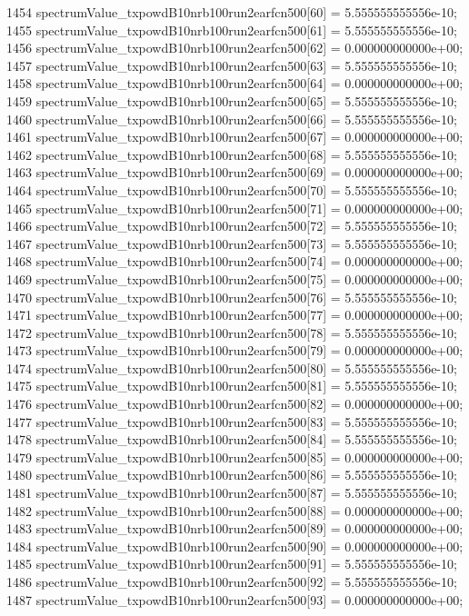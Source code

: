 \begin{DoxyCode}
1454   spectrumValue\_txpowdB10nrb100run2earfcn500[60] = 5.555555555556e-10;
1455   spectrumValue\_txpowdB10nrb100run2earfcn500[61] = 5.555555555556e-10;
1456   spectrumValue\_txpowdB10nrb100run2earfcn500[62] = 0.000000000000e+00;
1457   spectrumValue\_txpowdB10nrb100run2earfcn500[63] = 5.555555555556e-10;
1458   spectrumValue\_txpowdB10nrb100run2earfcn500[64] = 0.000000000000e+00;
1459   spectrumValue\_txpowdB10nrb100run2earfcn500[65] = 5.555555555556e-10;
1460   spectrumValue\_txpowdB10nrb100run2earfcn500[66] = 5.555555555556e-10;
1461   spectrumValue\_txpowdB10nrb100run2earfcn500[67] = 0.000000000000e+00;
1462   spectrumValue\_txpowdB10nrb100run2earfcn500[68] = 5.555555555556e-10;
1463   spectrumValue\_txpowdB10nrb100run2earfcn500[69] = 0.000000000000e+00;
1464   spectrumValue\_txpowdB10nrb100run2earfcn500[70] = 5.555555555556e-10;
1465   spectrumValue\_txpowdB10nrb100run2earfcn500[71] = 0.000000000000e+00;
1466   spectrumValue\_txpowdB10nrb100run2earfcn500[72] = 5.555555555556e-10;
1467   spectrumValue\_txpowdB10nrb100run2earfcn500[73] = 5.555555555556e-10;
1468   spectrumValue\_txpowdB10nrb100run2earfcn500[74] = 0.000000000000e+00;
1469   spectrumValue\_txpowdB10nrb100run2earfcn500[75] = 0.000000000000e+00;
1470   spectrumValue\_txpowdB10nrb100run2earfcn500[76] = 5.555555555556e-10;
1471   spectrumValue\_txpowdB10nrb100run2earfcn500[77] = 0.000000000000e+00;
1472   spectrumValue\_txpowdB10nrb100run2earfcn500[78] = 5.555555555556e-10;
1473   spectrumValue\_txpowdB10nrb100run2earfcn500[79] = 0.000000000000e+00;
1474   spectrumValue\_txpowdB10nrb100run2earfcn500[80] = 5.555555555556e-10;
1475   spectrumValue\_txpowdB10nrb100run2earfcn500[81] = 5.555555555556e-10;
1476   spectrumValue\_txpowdB10nrb100run2earfcn500[82] = 0.000000000000e+00;
1477   spectrumValue\_txpowdB10nrb100run2earfcn500[83] = 5.555555555556e-10;
1478   spectrumValue\_txpowdB10nrb100run2earfcn500[84] = 5.555555555556e-10;
1479   spectrumValue\_txpowdB10nrb100run2earfcn500[85] = 0.000000000000e+00;
1480   spectrumValue\_txpowdB10nrb100run2earfcn500[86] = 5.555555555556e-10;
1481   spectrumValue\_txpowdB10nrb100run2earfcn500[87] = 5.555555555556e-10;
1482   spectrumValue\_txpowdB10nrb100run2earfcn500[88] = 0.000000000000e+00;
1483   spectrumValue\_txpowdB10nrb100run2earfcn500[89] = 0.000000000000e+00;
1484   spectrumValue\_txpowdB10nrb100run2earfcn500[90] = 0.000000000000e+00;
1485   spectrumValue\_txpowdB10nrb100run2earfcn500[91] = 5.555555555556e-10;
1486   spectrumValue\_txpowdB10nrb100run2earfcn500[92] = 5.555555555556e-10;
1487   spectrumValue\_txpowdB10nrb100run2earfcn500[93] = 0.000000000000e+00;

\end{DoxyCode}
